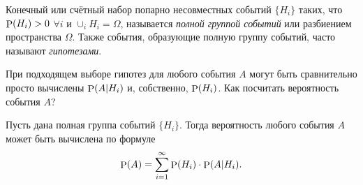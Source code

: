 \begin{to_def}
    Конечный или счётный набор попарно несовместных событий $\{H_i\}$ таких, что $\P(H_i)>0$ $\forall i$ и 
    $\cup_i H_i = \Omega$, называется \textit{полной группой событий} или разбиением пространства $\Omega$. 
    Также события, образующие полную группу событий, часто называют \textit{гипотезами}.
\end{to_def}

При подходящем выборе гипотез для любого события $A$ могут быть сравнительно просто вычислены $\P(A | H_i)$ и, собственно, $\P(H_i)$. Как посчитать вероятность события $A$?

\begin{to_thr}
    Пусть дана полная группа событий $\{H_i\}$. Тогда вероятность любого события $A$ может быть вычислена по формуле
    \begin{equation*}
        \P(A) = \sum_{i=1}^{\infty} \P(H_i) \cdot \P(A | H_i).
    \end{equation*}
\end{to_thr}